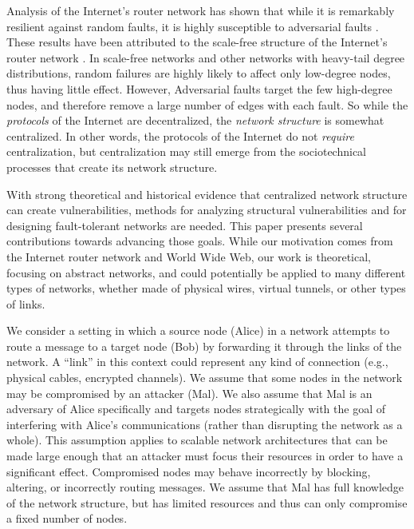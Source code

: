 \documentclass[sigconf]{acmart}
\begin{document}
Analysis of the Internet's router network has shown that while it
is remarkably resilient against random faults,
it is highly susceptible to adversarial faults \cite{albert_error_2000}.
These results have been attributed to the scale-free structure of the Internet's
router network
\cite{barabasi_emergence_1999,barabasi_scale-free_2009}.
In scale-free networks and other networks with heavy-tail degree distributions,
random failures are highly likely to
affect only low-degree nodes, thus having
little effect.
However, Adversarial faults target the few high-degree nodes,
and therefore remove a large number of edges with each fault.
So while the {\em protocols} of the Internet are decentralized,
the {\em network structure} is somewhat centralized. 
In other words, the protocols of the Internet do not {\em require}
centralization, but centralization may still emerge from the sociotechnical
processes that create its network structure.

With strong theoretical and historical evidence that centralized
network structure can create vulnerabilities,
methods for analyzing structural vulnerabilities and for designing
fault-tolerant networks are needed.
This paper presents several contributions towards advancing those goals.
While our motivation comes from the Internet router network and
World Wide Web,
our work is theoretical, focusing on abstract networks,
and could potentially be applied to many different types of networks,
whether made of physical wires, virtual tunnels,
or other types of links.

We consider a setting in which a source node (Alice)
in a network attempts to route a message
to a target node (Bob) by forwarding it through the links of the network.
A ``link'' in this context could represent any kind of connection
(e.g., physical cables, encrypted channels).
We assume that some nodes in the network may be compromised by an attacker
(Mal).
We also assume that Mal is an adversary of Alice specifically and targets
nodes strategically with the goal of interfering with Alice's communications
(rather than disrupting the network as a whole).
This assumption applies to scalable network architectures that can be made
large enough that an attacker must focus their resources in order to have
a significant effect.
Compromised nodes may behave incorrectly by blocking, altering,
or incorrectly routing messages.
We assume that Mal has full knowledge of the network structure, but has
limited resources and thus can only compromise a fixed number of nodes.
\end{document}
